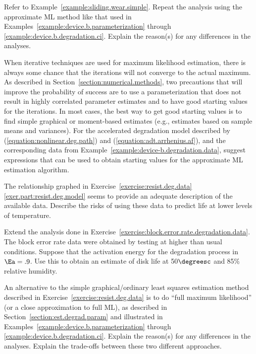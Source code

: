 \begin{exercise2}
Refer to Example~\ref{example:sliding.wear.simple}.  Repeat the
analysis using the approximate ML method like that used in
Examples~\ref{example:device.b.parameterization} through
\ref{example:device.b.degradation.ci}. Explain the
reason(s) for any differences in the analyses.
\end{exercise2}

\begin{exercise}
When iterative techniques are used for maximum likelihood estimation,
there is always some chance that the iterations will not converge to
the actual maximum.  As described in
Section~\ref{section:numerical.methods}, two precautions that will
improve the probability of success are to use a parameterization that
does not result in highly correlated parameter estimates and to have
good starting values for the iterations. In most cases, the best way
to get good starting values is to find simple graphical or
moment-based estimates (e.g., estimates based on sample means and
variances).  For the accelerated degradation model described by
(\ref{equation:nonlinear.deg.path}) and
(\ref{equation:adt.arrhenius.af}), and the corresponding data from
Example~\ref{example:device-b.degradation.data}, suggest expressions
that can be used to obtain starting values for the approximate ML
estimation algorithm.
\end{exercise}

\begin{exercise}
The relationship graphed in
Exercise~\ref{exercise:resist.deg.data}\ref{exer.part:resist.deg.model}
seems to provide an adequate description of the available
data. Describe the risks of using these data to predict life at
lower levels of temperature.
\end{exercise}

\begin{exercise}
\label{exercise:ber.adt.deg.data}
Extend the analysis done in
Exercise~\ref{exercise:block.error.rate.degradation.data}.  The
block error rate data were obtained by testing at higher than usual
conditions. Suppose that the activation energy for the degradation
process in $\Ea=.9$. Use this to obtain an estimate of disk life at
50$\degreesc$ and 85\% relative humidity.
\end{exercise}

\begin{exercise}
An alternative to the simple graphical/ordinary least squares
estimation method described in
Exercise~\ref{exercise:resist.deg.data} is to do ``full maximum
likelihood'' (or a close approximation to full ML), as described in
Section~\ref{section:est.degrad.param} and illustrated in
Examples~\ref{example:device.b.parameterization} through
\ref{example:device.b.degradation.ci}.  Explain the
reason(s) for any differences in the analyses.  Explain the
trade-offs between these two different approaches.
\end{exercise}


